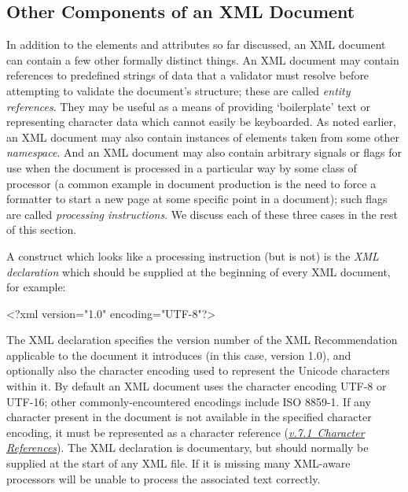 \subsection[{Other Components of an XML Document}]{Other Components of an XML Document}\label{SG-oth}\par
In addition to the elements and attributes so far discussed, an XML document can contain a few other formally distinct things. An XML document may contain references to predefined strings of data that a validator must resolve before attempting to validate the document's structure; these are called \textit{entity references}. They may be useful as a means of providing ‘boilerplate’ text or representing character data which cannot easily be keyboarded. As noted earlier, an XML document may also contain instances of elements taken from some other \textit{namespace}. And an XML document may also contain arbitrary signals or flags for use when the document is processed in a particular way by some class of processor (a common example in document production is the need to force a formatter to start a new page at some specific point in a document); such flags are called \textit{processing instructions}. We discuss each of these three cases in the rest of this section.\par
A construct which looks like a processing instruction (but is not) is the \textit{XML declaration} which should be supplied at the beginning of every XML document, for example: \par\hfill\bgroup\exampleFont\vskip 10pt\begin{shaded}
\obeyspaces <?xml version="1.0" encoding="UTF-8"?>\end{shaded}
\par\egroup 
 The XML declaration specifies the version number of the XML Recommendation applicable to the document it introduces (in this case, version 1.0), and optionally also the character encoding used to represent the Unicode characters within it. By default an XML document uses the character encoding UTF-8 or UTF-16; other commonly-encountered encodings include ISO 8859-1. If any character present in the document is not available in the specified character encoding, it must be represented as a character reference (\textit{\hyperref[SG-er]{v.7.1\ Character References}}). The XML declaration is documentary, but should normally be supplied at the start of any XML file. If it is missing many XML-aware processors will be unable to process the associated text correctly.
